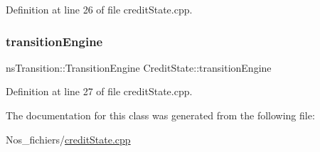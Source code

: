 Definition at line 26 of file credit\+State.\+cpp.

\mbox{\label{class_credit_state_a12c76114d83f1788b356c0cbbc74bcaf}} 
\subsubsection{\texorpdfstring{transition\+Engine}{transitionEngine}}
{\footnotesize\ttfamily ns\+Transition\+::\+Transition\+Engine Credit\+State\+::transition\+Engine}



Definition at line 27 of file credit\+State.\+cpp.



The documentation for this class was generated from the following file\+:\begin{DoxyCompactItemize}
\item 
Nos\+\_\+fichiers/\hyperlink{credit_state_8cpp}{credit\+State.\+cpp}\end{DoxyCompactItemize}
